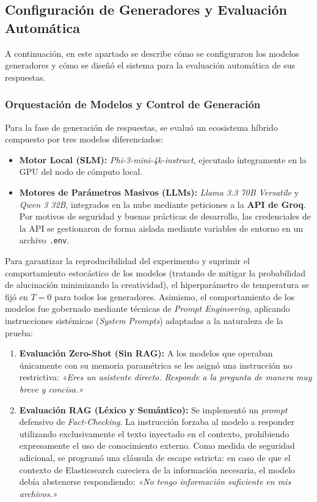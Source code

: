 \subsection{Configuración de Generadores y Evaluación Automática}

A continuación, en este apartado se describe cómo se configuraron los modelos generadores y cómo se diseñó el sistema para la evaluación automática de sus respuestas.

\subsubsection{Orquestación de Modelos y Control de Generación}

Para la fase de generación de respuestas, se evaluó un ecosistema híbrido compuesto por tres modelos diferenciados:
\begin{itemize}
    \item \textbf{Motor Local (SLM):} \textit{Phi-3-mini-4k-instruct}, ejecutado íntegramente en la GPU del nodo de cómputo local.
    \item \textbf{Motores de Parámetros Masivos (LLMs):} \textit{Llama 3.3 70B Versatile} y \textit{Qwen 3 32B}, integrados en la nube mediante peticiones a la \textbf{API de Groq}. Por motivos de seguridad y buenas prácticas de desarrollo, las credenciales de la API se gestionaron de forma aislada mediante variables de entorno en un archivo \texttt{.env}.
\end{itemize}

Para garantizar la reproducibilidad del experimento y suprimir el comportamiento estocástico de los modelos (tratando de mitigar la probabilidad de alucinación minimizando la creatividad), el hiperparámetro de temperatura se fijó en \textbf{$T=0$} para todos los generadores. Asimismo, el comportamiento de los modelos fue gobernado mediante técnicas de \textit{Prompt Engineering}, aplicando instrucciones sistémicas (\textit{System Prompts}) adaptadas a la naturaleza de la prueba:

\begin{enumerate}
    \item \textbf{Evaluación Zero-Shot (Sin RAG):} A los modelos que operaban únicamente con su memoria paramétrica se les asignó una instrucción no restrictiva: \textit{«Eres un asistente directo. Responde a la pregunta de manera muy breve y concisa.»}
    \item \textbf{Evaluación RAG (Léxico y Semántico):} Se implementó un \textit{prompt} defensivo de \textit{Fact-Checking}. La instrucción forzaba al modelo a responder utilizando exclusivamente el texto inyectado en el contexto, prohibiendo expresamente el uso de conocimiento externo. Como medida de seguridad adicional, se programó una cláusula de escape estricta: en caso de que el contexto de Elasticsearch careciera de la información necesaria, el modelo debía abstenerse respondiendo: \textit{«No tengo información suficiente en mis archivos.»}
\end{enumerate}

